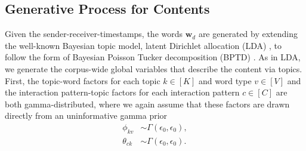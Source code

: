 \documentclass[ba]{imsart}
\numberwithin{equation}{section}
\theoremstyle{plain}
\begin{document}
		\subsection{Generative Process for Contents}\label{subsec:Content generating process}
		
		Given the sender-receiver-timestamps, the words $\boldsymbol{w}_d$ are generated by extending the well-known Bayesian topic model, latent Dirichlet allocation (LDA) \citep{Blei2003}, to follow the form of Bayesian Poisson Tucker decomposition (BPTD) \citep{schein2016bayesian}. As in LDA, we generate the corpus-wide global variables that describe the content via topics. First, the topic-word factors for each topic $k\in [K]$ and word type $v\in [V]$ and the interaction pattern-topic factors for each interaction pattern $c \in [C]$ are both gamma-distributed, where we again assume that these factors are drawn directly from an uninformative gamma prior
		\begin{equation}
			\begin{aligned}
				\phi_{kv}& \sim  \Gamma(\epsilon_0,\epsilon_0),\\
				\theta_{ck}& \sim  \Gamma(\epsilon_0,\epsilon_0).
			\end{aligned}
		\end{equation}
		
\end{document}
